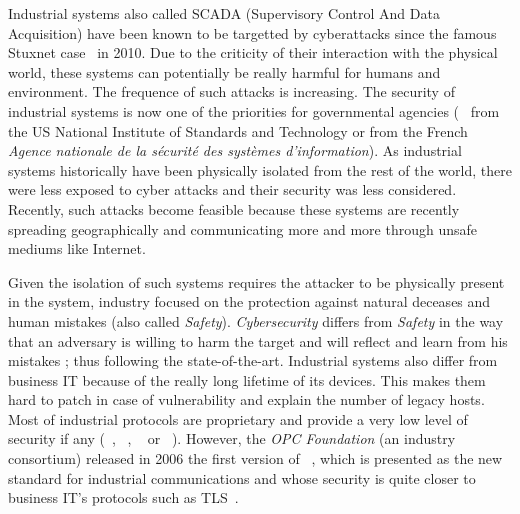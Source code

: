 
Industrial systems also called SCADA (Supervisory Control And Data
Acquisition) have been known to be targetted by cyberattacks since the
famous Stuxnet case~\cite{Lan11} in 2010.  Due to the criticity of
their interaction with the physical world, these systems can
potentially be really harmful for humans and environment.  The
frequence of such attacks is increasing.  The security of industrial
systems is now one of the priorities for governmental agencies
(\eg~\cite{SFS11} from the US National Institute of Standards and
Technology or
\cite{ANSSI12_guide_securite_industrielle_en} from the French {\em Agence
nationale de la sécurité des systèmes d'information}).  As industrial
systems historically have been physically isolated from the rest of
the world, there were less exposed to cyber attacks and their security
was less considered. Recently, such attacks become feasible because
these systems are recently spreading geographically and communicating
more and more through unsafe mediums like Internet.

Given the isolation of such systems requires the attacker to be
physically present in the system, industry focused on the protection
against natural deceases and human mistakes (also called {\em
Safety}).  {\em Cybersecurity} differs from {\em Safety} in the way
that an adversary is willing to harm the target and will reflect and
learn from his mistakes ; thus following the state-of-the-art.
Industrial systems also differ from business IT because of the really long
lifetime of its devices.
This makes them hard to patch in case of vulnerability and explain the number of
legacy hosts.
Most of industrial protocols are proprietary and provide a very low level of
security if any (\eg \modbus~\cite{MODBUS}, \profinet~\cite{PROFINET}, \etherip~\cite{Bro01} or
\dnp~\cite{CR04}).
However, the {\em OPC Foundation} (an industry consortium) released in 2006 the
first version of \opcua~\cite{MLD09}, which is presented as the new standard for
industrial communications and whose security is quite closer to business IT's
protocols such as TLS~\cite{DR08}.

